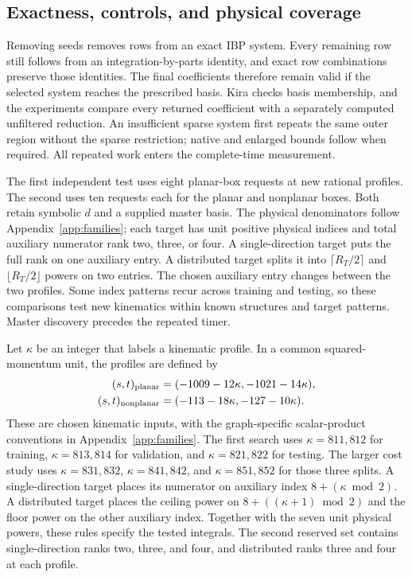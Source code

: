 \subsection{Exactness, controls, and physical coverage}
Removing seeds removes rows from an exact IBP system. Every remaining row still follows from an integration-by-parts identity, and exact row combinations preserve those identities. The final coefficients therefore remain valid if the selected system reaches the prescribed basis. Kira checks basis membership, and the experiments compare every returned coefficient with a separately computed unfiltered reduction. An insufficient sparse system first repeats the same outer region without the sparse restriction; native and enlarged bounds follow when required. All repeated work enters the complete-time measurement.

The first independent test uses eight planar-box requests at new rational profiles. The second uses ten requests each for the planar and nonplanar boxes. Both retain symbolic $d$ and a supplied master basis. The physical denominators follow Appendix~\ref{app:families}; each target has unit positive physical indices and total auxiliary numerator rank two, three, or four. A single-direction target puts the full rank on one auxiliary entry. A distributed target splits it into $\lceil R_T/2\rceil$ and $\lfloor R_T/2\rfloor$ powers on two entries. The chosen auxiliary entry changes between the two profiles. Some index patterns recur across training and testing, so these comparisons test new kinematics within known structures and target patterns. Master discovery precedes the repeated timer.

Let $\kappa$ be an integer that labels a kinematic profile. In a common squared-momentum unit, the profiles are defined by
\begin{align}
 (s,t)_{\rm planar}&=(-1009-12\kappa,-1021-14\kappa),\nonumber\\
 (s,t)_{\rm nonplanar}&=(-113-18\kappa,-127-10\kappa).
 \label{eq:geometry-profiles}
\end{align}
These are chosen kinematic inputs, with the graph-specific scalar-product conventions in Appendix~\ref{app:families}. The first search uses $\kappa=811,812$ for training, $\kappa=813,814$ for validation, and $\kappa=821,822$ for testing. The larger cost study uses $\kappa=831,832$, $\kappa=841,842$, and $\kappa=851,852$ for those three splits. A single-direction target places its numerator on auxiliary index $8+(\kappa\bmod2)$. A distributed target places the ceiling power on $8+((\kappa+1)\bmod2)$ and the floor power on the other auxiliary index. Together with the seven unit physical powers, these rules specify the tested integrals. The second reserved set contains single-direction ranks two, three, and four, and distributed ranks three and four at each profile.

